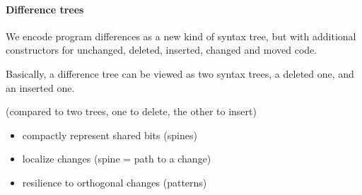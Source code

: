\documentclass[a4paper,11pt]{article}
\newcommand\del[1]{\text{\st{$#1$}}}
\newcommand\ins[1]{\text{\ul{$#1$}}}
\begin{document}
\paragraph{Difference trees}
We encode program differences as a new kind of syntax tree, but with additional
constructors for unchanged, deleted, inserted, changed and moved code.

\newcommand{\aSpineSum}{\ensuremath{\aSum\!\aSum}}
\newcommand{\aSpineProd}{\ensuremath{\aProd\!\aProd}}
\newcommand{\aDiffTree}{\ensuremath{\aTree\!\aTree}}
\newcommand{\aPatternTree}{\ensuremath{\mathsf{pat}}}
\newcommand{\aVar}{\ensuremath{\alpha}}
\newcommand{\defCopy}{\ensuremath{\square}}
\newcommand{\defIdent}[2]{\defNode{#1}{#2}}
\newcommand{\defReplace}[2]{\del{#1} \mapsto \ins{#2}}

Basically, a difference tree can be viewed as two syntax trees, a deleted one, and
an
inserted one. 


 (compared to two trees, one to delete, the other to insert)
\begin{itemize}
\item compactly represent shared bits (spines)
\item localize changes (spine = path to a change)
\item resilience to orthogonal changes (patterns)
\end{itemize}



\end{document}
